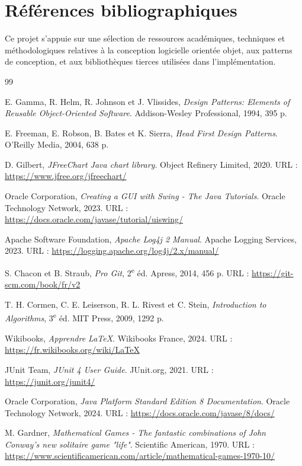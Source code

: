 \section{Références bibliographiques}
\label{sec:references}

Ce projet s'appuie sur une sélection de ressources académiques, techniques et
méthodologiques relatives à la conception logicielle orientée objet, aux patterns
de conception, et aux bibliothèques tierces utilisées dans l'implémentation.

\begin{thebibliography}{99}

   E. Gamma, R. Helm, R. Johnson et J. Vlissides,
   \textit{Design Patterns: Elements of Reusable Object-Oriented Software}.
   Addison-Wesley Professional, 1994, 395 p.

   E. Freeman, E. Robson, B. Bates et K. Sierra,
   \textit{Head First Design Patterns}.
   O'Reilly Media, 2004, 638 p.

   D. Gilbert,
   \textit{JFreeChart Java chart library}.
   Object Refinery Limited, 2020.
   URL : \url{https://www.jfree.org/jfreechart/}

   Oracle Corporation,
   \textit{Creating a GUI with Swing - The Java Tutorials}.
   Oracle Technology Network, 2023.
   URL : \url{https://docs.oracle.com/javase/tutorial/uiswing/}

   Apache Software Foundation,
   \textit{Apache Log4j 2 Manual}.
   Apache Logging Services, 2023.
   URL : \url{https://logging.apache.org/log4j/2.x/manual/}

   S. Chacon et B. Straub,
   \textit{Pro Git}, 2\textsuperscript{e} éd.
   Apress, 2014, 456 p.
   URL : \url{https://git-scm.com/book/fr/v2}

   T. H. Cormen, C. E. Leiserson, R. L. Rivest et C. Stein,
   \textit{Introduction to Algorithms}, 3\textsuperscript{e} éd.
   MIT Press, 2009, 1292 p.

   Wikibooks,
   \textit{Apprendre LaTeX}.
   Wikibooks France, 2024.
   URL : \url{https://fr.wikibooks.org/wiki/LaTeX}

   JUnit Team,
   \textit{JUnit 4 User Guide}.
   JUnit.org, 2021.
   URL : \url{https://junit.org/junit4/}

   Oracle Corporation,
   \textit{Java Platform Standard Edition 8 Documentation}.
   Oracle Technology Network, 2024.
   URL : \url{https://docs.oracle.com/javase/8/docs/}

   M. Gardner,
   \textit{Mathematical Games - The fantastic combinations of John Conway's new solitaire game "life"}.
   Scientific American, 1970.
   URL : \url{https://www.scientificamerican.com/article/mathematical-games-1970-10/}

\end{thebibliography}